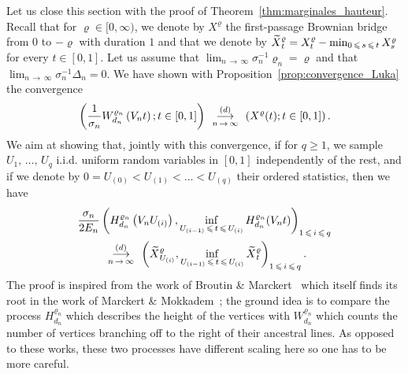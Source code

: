 \documentclass[10pt]{amsart}
\theoremstyle{definition}\newtheorem{defi}[theo]{Definition}\newtheorem{rema}[theo]{Remark}\newtheorem{exam}[theo]{Example}\newtheorem{exem}[theo]{Example}\newtheorem{nota}[theo]{Notation}
\newcommand{\1}{\ensembles{1}}
\newcommand{\tildep}[1]{\widetilde{#1}\vphantom{#1}}
\renewcommand{\le}{\leqslant}
\renewcommand{\ge}{\geqslant}
\newcommand{\Wfn}{W_{d_n}^{\varrho_n}}
\newcommand{\Hfn}{H_{d_n}^{\varrho_n}}
\newcommand{\tX}{\tildep{X}^{\varrho}}
\newcommand{\edges}{E}
\newcommand{\vertices}{V}
\newcommand{\cvloi}[1][n]{\enskip\mathop{\longrightarrow}^{(d)}_{#1\,\to\, \infty}\enskip}
\providecommand{\?}{}
\begin{document}
Let us close this section with the proof of Theorem~\ref{thm:marginales_hauteur}. Recall that for $\varrho \in [0,\infty)$, we denote by $X^\varrho$ the first-passage Brownian bridge from $0$ to $-\varrho$ with duration $1$ and that we denote by $\tX_t = X^\varrho_t - \min_{0\,\le\,s\,\le\,t} X^\varrho_s$ for every $t \in [0,1]$. Let us assume that $\lim_{n\,\to\,\infty} \sigma_n^{-1} \varrho_n = \varrho$ and that $\lim_{n\,\to\,\infty} \sigma_n^{-1} \Delta_n = 0$. We have shown with Proposition~\ref{prop:convergence_Luka} the convergence
\[
\left(\frac{1}{\sigma_n} \Wfn\left(\vertices_n t\right) ; t \in [0,1]\right)
\cvloi
\left(X^\varrho(t) ; t \in [0,1]\right).
\]
We aim at showing that, jointly with this convergence, if for $q \ge 1$, we sample $U_1,\,\dots,\,U_q$ i.i.d. uniform random variables in $[0,1]$ independently of the rest, and if we denote by $0 = U_{(0)} < U_{(1)} < \dots < U_{(q)}$ their ordered statistics, then we have
\begin{multline*}
\frac{\sigma_n}{2 \edges_n} \left(\Hfn\left(\vertices_n U_{(i)}\right), \inf_{U_{(i-1)}\,\le\,t\,\le\,U_{(i)}} \Hfn(\vertices_n t)\right)_{1\,\le\,i\,\le\,q}\\
\cvloi
\left(\tX_{U_{(i)}}, \inf_{U_{(i-1)}\,\le\,t\,\le\, U_{(i)}} \tX_t\right)_{1\,\le\,i\,\le\,q}.
\end{multline*}
The proof is inspired from the work of Broutin \& Marckert~\cite{BM14} which itself finds its root in the work of Marckert \& Mokkadem~\cite{MM03}; the ground idea is to compare the process $\Hfn$ which describes the height of the vertices with $\Wfn$ which counts the number of vertices branching off to the right of their ancestral lines. As opposed to these works, these two processes have different scaling here so one has to be more careful.
\end{document}
